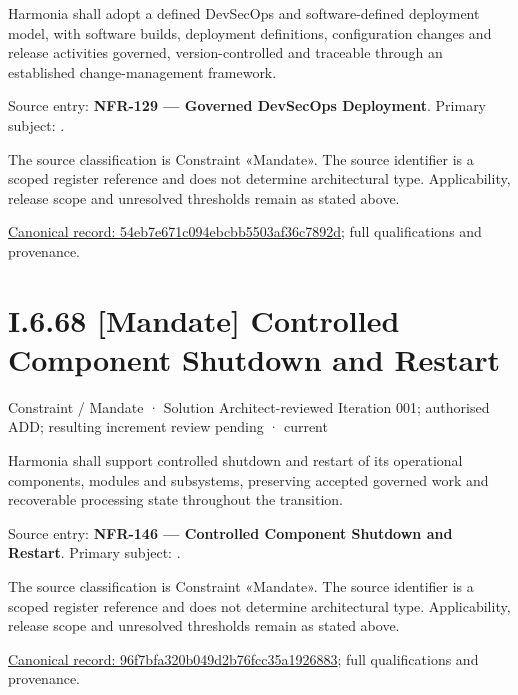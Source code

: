 Harmonia shall adopt a defined DevSecOps and software-defined deployment model, with software builds, deployment definitions, configuration changes and release activities governed, version-controlled and traceable through an established change-management framework.



Source entry: \textbf{NFR-129 — Governed DevSecOps Deployment}. Primary subject: \texttt{}.



The source classification is Constraint «Mandate». The source identifier is a scoped register reference and does not determine architectural type. Applicability, release scope and unresolved thresholds remain as stated above.


{\footnotesize \href{../../../../../../../../continuum/motivation/constraint/mandate/54eb7e671c094ebcbb5503af36c7892d.md}{Canonical record: 54eb7e671c094ebcbb5503af36c7892d}; full qualifications and provenance.}\par
\section*{I.6.68 [Mandate] Controlled Component Shutdown and Restart}
\label{navigation:I.6.68}

\label{element:96f7bfa320b049d2b76fcc35a1926883}
{\small Constraint / Mandate · Solution Architect-reviewed Iteration 001; authorised ADD; resulting increment review pending · current}\par

Harmonia shall support controlled shutdown and restart of its operational components, modules and subsystems, preserving accepted governed work and recoverable processing state throughout the transition.



Source entry: \textbf{NFR-146 — Controlled Component Shutdown and Restart}. Primary subject: \texttt{}.



The source classification is Constraint «Mandate». The source identifier is a scoped register reference and does not determine architectural type. Applicability, release scope and unresolved thresholds remain as stated above.


{\footnotesize \href{../../../../../../../../continuum/motivation/constraint/mandate/96f7bfa320b049d2b76fcc35a1926883.md}{Canonical record: 96f7bfa320b049d2b76fcc35a1926883}; full qualifications and provenance.}\par
